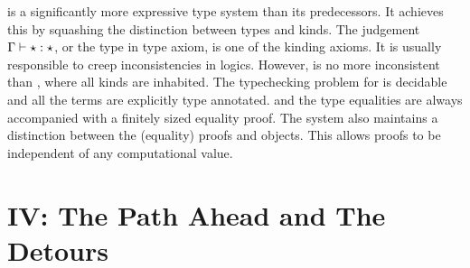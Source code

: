 \documentclass[screen,nonacm,manuscript,review]{acmart} %
\begin{document}
\SFK is a significantly more expressive type system than its predecessors. It achieves this by squashing
the distinction between types and kinds. The judgement $\Gamma \vdash \star : \star$,
or the type in type axiom, is one of the kinding axioms.
It is usually responsible to creep inconsistencies in logics.
However, \SFK is no more inconsistent than \SFC, where all kinds are inhabited.
The typechecking problem for \SFK is decidable and all the terms are explicitly type annotated.
and the type equalities are always accompanied with a finitely sized equality proof.
The system also maintains a distinction between the (equality)
proofs and objects. This allows proofs to be independent of any computational value.

\part{IV: The Path Ahead and The Detours}\label{part:IV}
\end{document}
